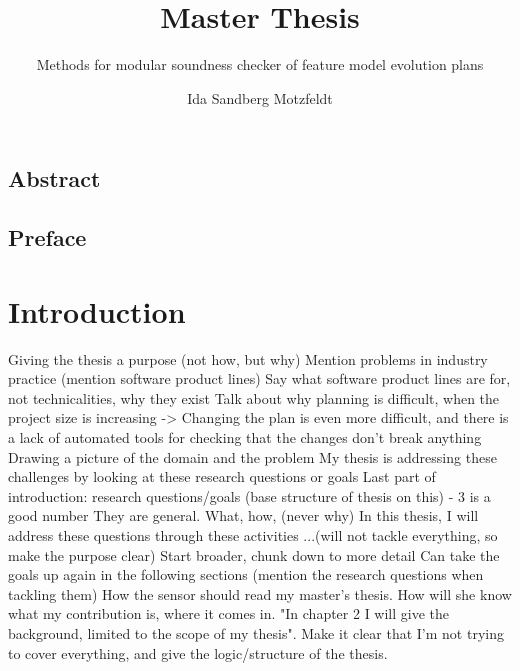 \documentclass[a4paper,english]{ifimaster}
\title{Master Thesis}
\subtitle{Methods for modular soundness checker of feature model evolution plans}
\author{Ida Sandberg Motzfeldt}
\begin{document}
\duoforside[dept={Department of Informatics},
program={Informatics: Programming and System Architecture},
            option={Software},
long]

\frontmatter{}
\chapter*{Abstract}

\tableofcontents{}
\listoffigures{}
\listoftables{}

\chapter*{Preface}

\mainmatter{}
\part{Introduction}

Giving the thesis a purpose (not how, but why)
  Mention problems in industry practice (mention software product lines)
  Say what software product lines are for, not technicalities, why they exist
  Talk about why planning is difficult, when the project size is increasing
  -> Changing the plan is even more difficult, and there is a lack of automated tools for checking that the changes don't break anything
  Drawing a picture of the domain and the problem
  My thesis is addressing these challenges by looking at these research questions or goals
Last part of introduction: research questions/goals (base structure of thesis on this) - 3 is a good number
They are general. What, how, (never why)
In this thesis, I will address these questions through these activities ...(will not tackle everything, so make the purpose clear)
Start broader, chunk down to more detail
Can take the goals up again in the following sections (mention the research questions when tackling them)
How the sensor should read my master's thesis. How will she know what my contribution is, where it comes in. "In chapter 2 I will give the background, limited to the scope of my thesis". Make it clear that I'm not trying to cover everything, and give the logic/structure of the thesis.

\end{document}
